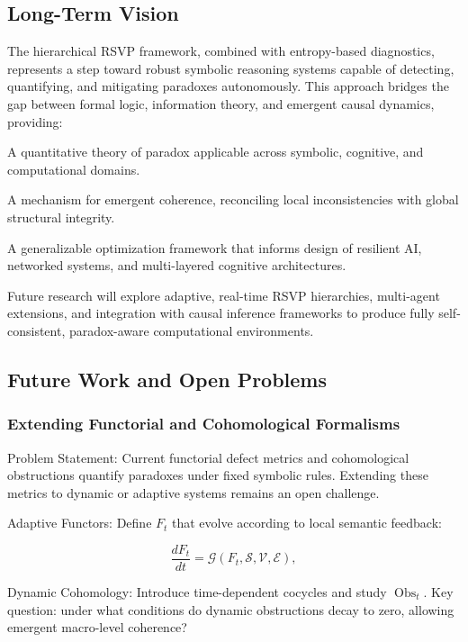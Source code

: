 \documentclass[12pt]{article}
\theoremstyle{plain}
\begin{document}
\subsection{Long-Term Vision}

The hierarchical RSVP framework, combined with entropy-based diagnostics, represents a step toward robust symbolic reasoning systems capable of detecting, quantifying, and mitigating paradoxes autonomously. This approach bridges the gap between formal logic, information theory, and emergent causal dynamics, providing:

A quantitative theory of paradox applicable across symbolic, cognitive, and computational domains.

A mechanism for emergent coherence, reconciling local inconsistencies with global structural integrity.

A generalizable optimization framework that informs design of resilient AI, networked systems, and multi-layered cognitive architectures.

Future research will explore adaptive, real-time RSVP hierarchies, multi-agent extensions, and integration with causal inference frameworks to produce fully self-consistent, paradox-aware computational environments.

\subsection{Future Work and Open Problems}

\subsubsection{Extending Functorial and Cohomological Formalisms}

Problem Statement: Current functorial defect metrics and cohomological obstructions quantify paradoxes under fixed symbolic rules. Extending these metrics to dynamic or adaptive systems remains an open challenge.

Adaptive Functors: Define \(F_t\) that evolve according to local semantic feedback:

\begin{equation}
\frac{dF_t}{dt} = \mathcal{G}(F_t, \mathcal{S}, \mathcal{V}, \mathcal{E}),
\end{equation}

Dynamic Cohomology: Introduce time-dependent cocycles and study \(\operatorname{Obs}_t\). Key question: under what conditions do dynamic obstructions decay to zero, allowing emergent macro-level coherence?
\end{document}
